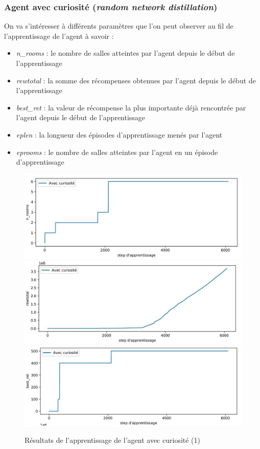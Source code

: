 \documentclass[a4paper,12pt]{report}
\begin{document}
\subsubsection{Agent avec curiosité (\textit{random network distillation})}
On va s'intéresser à différents paramètres que l'on peut observer au fil de l'apprentissage de l'agent à savoir :
\begin{itemize}
    \item \textit{n\_rooms} : le nombre de salles atteintes par l'agent depuis le début de l'apprentissage
    \item \textit{rewtotal} : la somme des récompenses obtenues par l'agent depuis le début de l'apprentissage
    \item \textit{best\_ret} : la valeur de récompense la plus importante déjà rencontrée par l'agent depuis le début de l'apprentissage
    \item \textit{eplen} : la longueur des épisodes d'apprentissage menés par l'agent
    \item \textit{eprooms} : le nombre de salles atteintes par l'agent en un épisode d'apprentissage
\end{itemize}

\begin{figure}[H]
    \centering
    \includegraphics[width=\textwidth]{curiosity_only/curiosity_n_rooms.JPG}\\
    \includegraphics[width=\textwidth]{curiosity_only/curiosity_rewtotal.JPG}\\
    \includegraphics[width=\textwidth]{curiosity_only/curiosity_best_ret.JPG}
    \caption{Résultats de l'apprentissage de l'agent avec curiosité (1)}
\end{figure}
\end{document}
